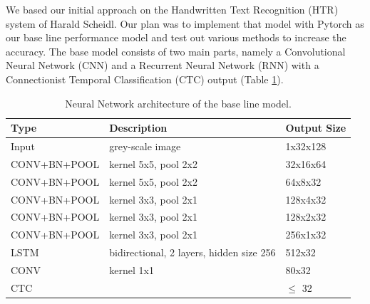 \documentclass{article}
\begin{document}
We based our initial approach on the Handwritten Text Recognition (HTR) system of Harald Scheidl\cite{ScheidlHTR}\cite{ScheidlCTC}. Our plan was to implement that model with Pytorch as our base line performance model and test out various methods to increase the accuracy. The base model consists of two main parts, namely a Convolutional Neural Network (CNN) and a Recurrent Neural Network (RNN) with a Connectionist Temporal Classification (CTC) output (Table \ref{tab:SmallModel}).
\begin{table}[H]
\centering
\begin{tabular}{l|l|l}
Type & Description & Output Size \\ \hline
Input & grey-scale image & 1x32x128 \\ \hline
CONV+BN+POOL & kernel 5x5, pool 2x2 & 32x16x64 \\ \hline
CONV+BN+POOL & kernel 5x5, pool 2x2 & 64x8x32 \\ \hline
CONV+BN+POOL & kernel 3x3, pool 2x1 & 128x4x32 \\ \hline
CONV+BN+POOL & kernel 3x3, pool 2x1 & 128x2x32 \\ \hline
CONV+BN+POOL & kernel 3x3, pool 2x1 & 256x1x32 \\ \hline
LSTM         & bidirectional, 2 layers, hidden size 256 & 512x32 \\ \hline
CONV         & kernel 1x1 & 80x32 \\ \hline
CTC          &      & \(\leqslant\) 32 \\ \hline
\end{tabular}
\caption{Neural Network architecture of the base line model.}
\label{tab:SmallModel}
\end{table}
\end{document}
